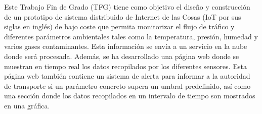 Este Trabajo Fin de Grado (TFG) tiene como objetivo el diseño y construcción de un prototipo de sistema distribuido de Internet de las Cosas (IoT por sus siglas en inglés) de bajo coste que permita monitorizar el flujo de tráfico y diferentes parámetros ambientales tales como la temperatura, presión, humedad y varios gases contaminantes. Esta información se envía a un servicio en la nube donde será procesada. Además, se ha desarrollado una página web donde se muestran en tiempo real los datos recopilados por los diferentes sensores. Esta página web también contiene un sistema de alerta para informar a la autoridad de transporte si un parámetro concreto supera un umbral predefinido, así como una sección donde los datos recopilados en un intervalo de tiempo son mostrados en una gráfica.



